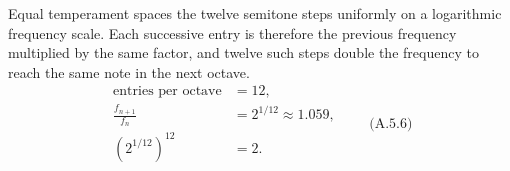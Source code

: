 Equal temperament spaces the twelve semitone steps uniformly on a logarithmic frequency scale. Each successive entry is therefore the previous frequency multiplied by the same factor, and twelve such steps double the frequency to reach the same note in the next octave.
\[
\boxed{\begin{aligned}
\text{entries per octave}&=12,\\
\frac{f_{n+1}}{f_n}&=2^{1/12}\approx1.059,\\
\left(2^{1/12}\right)^{12}&=2.
\end{aligned}}\qquad\text{(A.5.6)}
\]

\clearpage
{}

